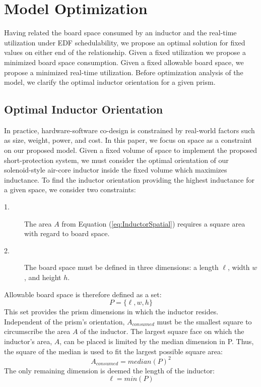 \documentclass[11pt,oneside]{report}
\begin{document}
    \chapter{Model Optimization}\label{chap:model optimization}
    Having related the board space consumed by an inductor and the real-time utilization under EDF schedulability, we propose an optimal solution for fixed values on either end of the relationship. Given a fixed utilization we propose a minimized board space consumption. Given a fixed allowable board space, we propose a minimized real-time utilization. Before optimization analysis of the model, we clarify the optimal inductor orientation for a given prism.
    
    \section{Optimal Inductor Orientation}
    In practice, hardware-software co-design is constrained by real-world factors such as size, weight, power, and cost. In this paper, we focus on space as a constraint on our proposed model.
    Given a fixed volume of space to implement the proposed short-protection system, we must consider the optimal orientation of our solenoid-style air-core inductor inside the fixed volume which maximizes inductance. 
    To find the inductor orientation providing the highest inductance for a given space, we consider two constraints:
    \begin{description}
    \item [1.] The area $A$ from Equation (\ref{eq:InductorSpatial}) requires a square area with regard to board space.
    \item [2.] The board space must be defined in three dimensions: a length $\ell$, width $w$, and height $h$.
    \end{description}
    Allowable board space is therefore defined as a set:
    \begin{equation}\label{eq:Prism}
    P = \{\ell,w,h\}
    \end{equation}
    This set provides the prism dimensions in which the inductor resides. Independent of the prism's orientation, $A_{consumed}$ must be the smallest square to circumscribe the area $A$ of the inductor. The largest square face on which the inductor's area, $A$, can be placed is limited by the median dimension in P. Thus, the square of the median is used to fit the largest possible square area:
    \begin{equation}\label{eq:PrismAreaConsumed}
    A_{consumed} = median(P)^2
    \end{equation}
    The only remaining dimension is deemed the length of the inductor:
    \begin{equation}\label{eq:PrismLength}
    \ell = min(P)
    \end{equation}
    
\end{document}
